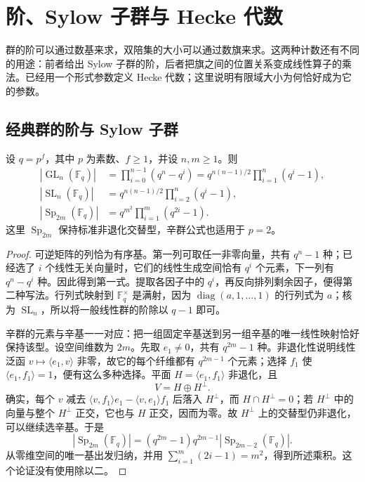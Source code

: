 
\section{阶、Sylow 子群与 Hecke 代数}
\label{b5:sec:F04}

群的阶可以通过数基来求，双陪集的大小可以通过数旗来求。这两种计数还有不同的用途：前者给出 Sylow 子群的阶，后者把旗之间的位置关系变成线性算子的乘法。已经用一个形式参数定义 Hecke 代数；这里说明有限域大小为何恰好成为它的参数。

\subsection{经典群的阶与 Sylow 子群}
\label{b5:subsec:F04:01}

\begin{proposition}\label{b5:prop:F-classical-orders}
	设 \(q=p^f\)，其中 \(p\) 为素数、\(f\ge1\)，并设 \(n,m\ge1\)。则
	\[
		\begin{aligned}
			|\operatorname{GL}_n(\mathbb F_q)|
			&=\prod_{i=0}^{n-1}(q^n-q^i)
			=q^{n(n-1)/2}\prod_{i=1}^n(q^i-1),\\
			|\operatorname{SL}_n(\mathbb F_q)|
			&=q^{n(n-1)/2}\prod_{i=2}^n(q^i-1),\\
			|\operatorname{Sp}_{2m}(\mathbb F_q)|
			&=q^{m^2}\prod_{i=1}^m(q^{2i}-1).
		\end{aligned}
	\]
	这里 \(\operatorname{Sp}_{2m}\) 保持标准非退化交替型，辛群公式也适用于 \(p=2\)。
\end{proposition}
\begin{proof}
	可逆矩阵的列恰为有序基。第一列可取任一非零向量，共有 \(q^n-1\) 种；已经选了 \(i\) 个线性无关向量时，它们的线性生成空间恰有 \(q^i\) 个元素，下一列有 \(q^n-q^i\) 种。因此得到第一式。提取各因子中的 \(q^i\)，再反向排列剩余因子，便得第二种写法。行列式映射到 \(\mathbb F_q^\times\) 是满射，因为 \(\operatorname{diag}(a,1,\ldots,1)\) 的行列式为 \(a\)；核为 \(\operatorname{SL}_n\)，所以将一般线性群的阶除以 \(q-1\) 即可。

	辛群的元素与辛基一一对应：把一组固定辛基送到另一组辛基的唯一线性映射恰好保持该型。设空间维数为 \(2m\)。先取 \(e_1\ne0\)，共有 \(q^{2m}-1\) 种。非退化性说明线性泛函 \(v\mapsto\langle e_1,v\rangle\) 非零，故它的每个纤维都有 \(q^{2m-1}\) 个元素；选择 \(f_1\) 使 \(\langle e_1,f_1\rangle=1\)，便有这么多种选择。平面 \(H=\langle e_1,f_1\rangle\) 非退化，且
	\[
		V=H\oplus H^\perp.
	\]
	确实，每个 \(v\) 减去 \(\langle v,f_1\rangle e_1-\langle v,e_1\rangle f_1\) 后落入 \(H^\perp\)，而 \(H\cap H^\perp=0\)；若 \(H^\perp\) 中的向量与整个 \(H^\perp\) 正交，它也与 \(H\) 正交，因而为零。故 \(H^\perp\) 上的交替型仍非退化，可以继续选辛基。于是
	\[
		|\operatorname{Sp}_{2m}(\mathbb F_q)|
		=(q^{2m}-1)q^{2m-1}|\operatorname{Sp}_{2m-2}(\mathbb F_q)|.
	\]
	从零维空间的唯一基出发归纳，并用 \(\sum_{i=1}^m(2i-1)=m^2\)，得到所述乘积。这个论证没有使用除以二。
\end{proof}

